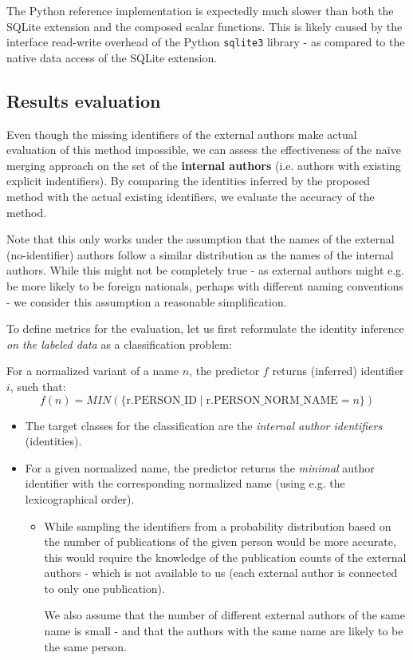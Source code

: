 The Python reference implementation is expectedly much slower than both the SQLite extension and the composed scalar functions.
This is likely caused by the interface read-write overhead of the Python \texttt{sqlite3} library - as compared to the native data access of the SQLite extension.

\subsection{Results evaluation}\label{sec:results-assessment}

Even though the missing identifiers of the external authors make actual evaluation of this method impossible, 
we can assess the effectiveness of the naïve merging approach on the set of the \textbf{internal authors} (i.e. authors with existing explicit indentifiers).
By comparing the identities inferred by the proposed method with the actual existing identifiers, we evaluate the accuracy of the method.

Note that this only works under the assumption that the names of the external (no-identifier) authors follow a similar distribution as the names of the internal authors.
While this might not be completely true - as external authors might e.g. be more likely to be foreign nationals, perhaps with different naming conventions - we consider this assumption a reasonable simplification.

To define metrics for the evaluation, let us first reformulate the identity inference \textit{on the labeled data} as a classification problem:

For a normalized variant of a name $n$, the predictor $f$ returns (inferred) identifier $i$, such that:
$$
f(n) = MIN(\{\text{r.PERSON\_ID}\;|\;\text{r.PERSON\_NORM\_NAME} = n\})
$$

\begin{itemize}
    \item The target classes for the classification are the \textit{internal author identifiers} (identities). 
    \item For a given normalized name, the predictor returns the \textit{minimal} author identifier with the corresponding normalized name (using e.g. the lexicographical order).
    \begin{itemize} 
        \item While sampling the identifiers from a probability distribution based on the number of publications of the given person would be more accurate,
        this would require the knowledge of the publication counts of the external authors - which is not available to us (each external author is connected to only one publication).
        
        We also assume that the number of different external authors of the same name is small - and that the authors with the same name are likely to be the same person.
    \end{itemize}
\end{itemize}

